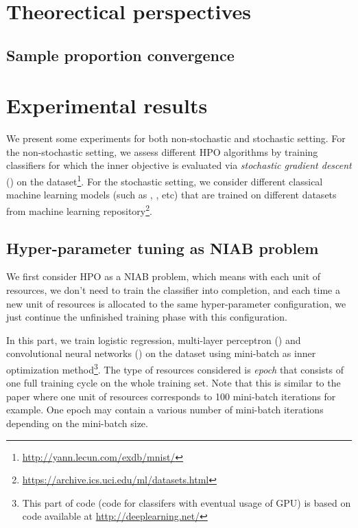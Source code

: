 \documentclass[twoside,11pt]{article}
\begin{document}
\section{Theorectical perspectives}

\subsection{Sample proportion convergence}



\section{Experimental results}\label{sec:result}

We present some experiments for both non-stochastic and stochastic setting. For the non-stochastic setting, we assess different HPO algorithms by training classifiers for which the inner objective is evaluated via \emph{stochastic gradient descent} (\SGD) on the \MNIST dataset\footnote{\url{http://yann.lecun.com/exdb/mnist/}}. For the stochastic setting, we consider different classical machine learning models (such as \SVM, \KNN, etc) that are trained on different datasets from \UCI machine learning repository\footnote{\url{https://archive.ics.uci.edu/ml/datasets.html}}.

\subsection{Hyper-parameter tuning as NIAB problem}

We first consider HPO as a NIAB problem, which means with each unit of resources, we don't need to train the classifier into completion, and each time a new unit of resources is allocated to the same hyper-parameter configuration, we just continue the unfinished training phase with this configuration. 

In this part, we train logistic regression, multi-layer perceptron (\MLP) and convolutional neural networks (\CNN) on the \MNIST dataset using mini-batch  \SGD as inner optimization method\footnote{This part of code (code for classifers with eventual usage of GPU) is based on code available at \url{http://deeplearning.net/}}. The type of resources considered is \emph{epoch} that consists of one full training cycle on the whole training set. Note that this is similar to the \Hyperband paper where one unit of resources corresponds to 100 mini-batch iterations for example. One epoch may contain a various number of mini-batch iterations depending on the mini-batch size.
\end{document}
